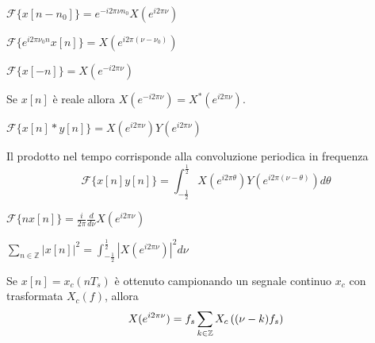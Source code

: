         \begin{property}[Traslazione]
            $\mathcal{F}\{x[n - n_0]\} = e^{-i 2 \pi \nu n_0} X(e^{i 2 \pi \nu})$
        \end{property}

        \begin{property}[Modulazione]
            $\mathcal{F}\{e^{i 2 \pi \nu_0 n} x[n]\} = X(e^{i 2 \pi (\nu - \nu_0)})$
        \end{property}

        \begin{property}
            $\mathcal{F}\{x[-n]\} = X(e^{-i 2 \pi \nu})$
        \end{property}

        \begin{property}
            Se $x[n]$ è reale allora $X(e^{-i 2 \pi \nu}) = X^*(e^{i 2 \pi \nu})$.
        \end{property}

        \begin{property}[Convoluzione]
            $\mathcal{F}\{x[n] * y[n]\} = X(e^{i 2 \pi \nu}) Y(e^{i 2 \pi \nu})$
        \end{property}

        \begin{property}
            Il prodotto nel tempo corrisponde alla convoluzione periodica in frequenza
            \[
                \mathcal{F}\{x[n] y[n]\} = \int_{-\frac{1}{2}}^{\frac{1}{2}} X(e^{i 2 \pi \theta}) Y(e^{i 2 \pi (\nu - \theta)}) d\theta
            \]
        \end{property}

        \begin{property}
            $\mathcal{F}\{n x[n]\} = \frac{i}{2 \pi} \frac{d}{d\nu} X(e^{i 2 \pi \nu})$
        \end{property}

        \begin{property}[Parseval]
            $\displaystyle \sum_{n \in \mathbb{Z}} |x[n]|^2 = \int_{-\frac{1}{2}}^{\frac{1}{2}} |X(e^{i 2 \pi \nu})|^2 d\nu$
        \end{property}

        \begin{property}
            Se $x[n] = x_c(n T_s)$ è ottenuto campionando un segnale continuo $x_c$ con trasformata $X_c(f)$, allora
            \[
                X(e^{i 2 \pi \nu}) = f_s \sum_{k \in \mathbb{Z}} X_c\qty((\nu - k) f_s)
            \]
        \end{property}

